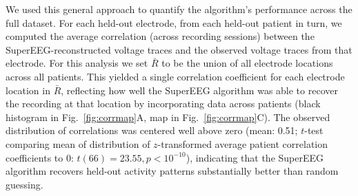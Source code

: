 \documentclass[11pt]{article}
\begin{document}
We used this general approach to quantify the algorithm's performance across the
full dataset. For each held-out electrode, from each held-out patient in turn,
we computed the average correlation (across recording sessions) between the
SuperEEG-reconstructed voltage traces and the observed voltage traces from that
electrode.  For this analysis we set $\bar{R}$ to be the union of all electrode
locations across all patients.  This yielded a single correlation coefficient
for each electrode location in $\bar{R}$, reflecting how well the SuperEEG
algorithm was able to recover the recording at that location by incorporating
data across patients (black histogram in Fig.~\ref{fig:corrmap}A, map in
Fig.~\ref{fig:corrmap}C).  The observed distribution of correlations was
centered well above zero (mean: 0.51; $t$-test comparing mean of distribution of
$z$-transformed average patient correlation coefficients to 0: $t(66) = 23.55, p
< 10^{-10}$), indicating that the SuperEEG algorithm recovers held-out activity
patterns substantially better than random guessing.
\end{document}
